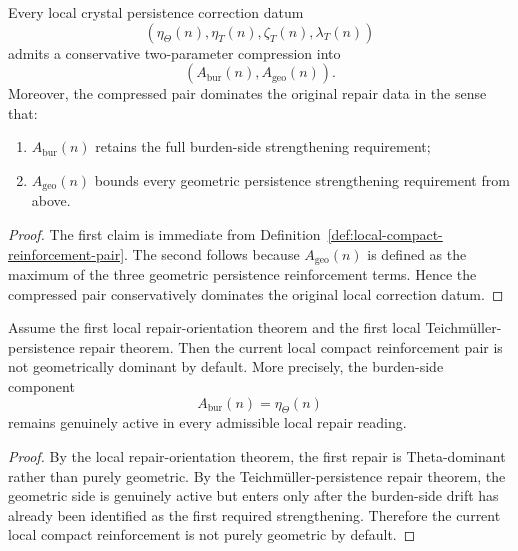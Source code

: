 \begin{proposition}
\label{prop:crystal-persistence-correction-datum-admits-two-parameter-compression}
Every local crystal persistence correction datum
\[
 (\eta_{\Theta}(n),\eta_T(n),\zeta_T(n),\lambda_T(n))
\]
admits a conservative two-parameter compression into
\[
 (A_{\mathrm{bur}}(n),A_{\mathrm{geo}}(n)).
\]
Moreover, the compressed pair dominates the original repair data in the sense that:
\begin{enumerate}[leftmargin=2em,label=(\alph*)]
 \item $A_{\mathrm{bur}}(n)$ retains the full burden-side strengthening requirement;
 \item $A_{\mathrm{geo}}(n)$ bounds every geometric persistence strengthening requirement from above.
\end{enumerate}
\end{proposition}

\begin{proof}
The first claim is immediate from Definition~\ref{def:local-compact-reinforcement-pair}.
The second follows because $A_{\mathrm{geo}}(n)$ is defined as the maximum of the three geometric persistence reinforcement terms.
Hence the compressed pair conservatively dominates the original local correction datum.
\end{proof}

\begin{proposition}
\label{prop:current-local-reinforcement-is-not-purely-geometric}
Assume the first local repair-orientation theorem and the first local Teichmüller-persistence repair theorem.
Then the current local compact reinforcement pair is not geometrically dominant by default.
More precisely, the burden-side component
\[
 A_{\mathrm{bur}}(n)=\eta_{\Theta}(n)
\]
remains genuinely active in every admissible local repair reading.
\end{proposition}

\begin{proof}
By the local repair-orientation theorem, the first repair is Theta-dominant rather than purely geometric.
By the Teichmüller-persistence repair theorem, the geometric side is genuinely active but enters only after the burden-side drift has already been identified as the first required strengthening.
Therefore the current local compact reinforcement is not purely geometric by default.
\end{proof}

